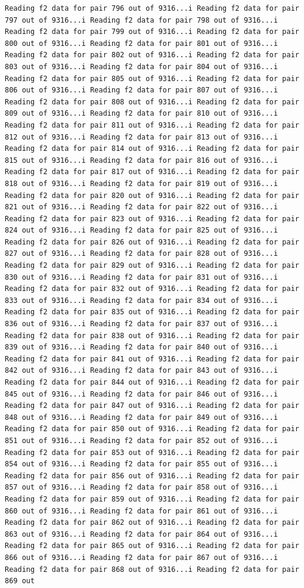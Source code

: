 \documentclass[
]{article}
\begin{document}
\begin{verbatim}
Reading f2 data for pair 796 out of 9316...i Reading f2 data for pair 797 out of 9316...i Reading f2 data for pair 798 out of 9316...i Reading f2 data for pair 799 out of 9316...i Reading f2 data for pair 800 out of 9316...i Reading f2 data for pair 801 out of 9316...i Reading f2 data for pair 802 out of 9316...i Reading f2 data for pair 803 out of 9316...i Reading f2 data for pair 804 out of 9316...i Reading f2 data for pair 805 out of 9316...i Reading f2 data for pair 806 out of 9316...i Reading f2 data for pair 807 out of 9316...i Reading f2 data for pair 808 out of 9316...i Reading f2 data for pair 809 out of 9316...i Reading f2 data for pair 810 out of 9316...i Reading f2 data for pair 811 out of 9316...i Reading f2 data for pair 812 out of 9316...i Reading f2 data for pair 813 out of 9316...i Reading f2 data for pair 814 out of 9316...i Reading f2 data for pair 815 out of 9316...i Reading f2 data for pair 816 out of 9316...i Reading f2 data for pair 817 out of 9316...i Reading f2 data for pair 818 out of 9316...i Reading f2 data for pair 819 out of 9316...i Reading f2 data for pair 820 out of 9316...i Reading f2 data for pair 821 out of 9316...i Reading f2 data for pair 822 out of 9316...i Reading f2 data for pair 823 out of 9316...i Reading f2 data for pair 824 out of 9316...i Reading f2 data for pair 825 out of 9316...i Reading f2 data for pair 826 out of 9316...i Reading f2 data for pair 827 out of 9316...i Reading f2 data for pair 828 out of 9316...i Reading f2 data for pair 829 out of 9316...i Reading f2 data for pair 830 out of 9316...i Reading f2 data for pair 831 out of 9316...i Reading f2 data for pair 832 out of 9316...i Reading f2 data for pair 833 out of 9316...i Reading f2 data for pair 834 out of 9316...i Reading f2 data for pair 835 out of 9316...i Reading f2 data for pair 836 out of 9316...i Reading f2 data for pair 837 out of 9316...i Reading f2 data for pair 838 out of 9316...i Reading f2 data for pair 839 out of 9316...i Reading f2 data for pair 840 out of 9316...i Reading f2 data for pair 841 out of 9316...i Reading f2 data for pair 842 out of 9316...i Reading f2 data for pair 843 out of 9316...i Reading f2 data for pair 844 out of 9316...i Reading f2 data for pair 845 out of 9316...i Reading f2 data for pair 846 out of 9316...i Reading f2 data for pair 847 out of 9316...i Reading f2 data for pair 848 out of 9316...i Reading f2 data for pair 849 out of 9316...i Reading f2 data for pair 850 out of 9316...i Reading f2 data for pair 851 out of 9316...i Reading f2 data for pair 852 out of 9316...i Reading f2 data for pair 853 out of 9316...i Reading f2 data for pair 854 out of 9316...i Reading f2 data for pair 855 out of 9316...i Reading f2 data for pair 856 out of 9316...i Reading f2 data for pair 857 out of 9316...i Reading f2 data for pair 858 out of 9316...i Reading f2 data for pair 859 out of 9316...i Reading f2 data for pair 860 out of 9316...i Reading f2 data for pair 861 out of 9316...i Reading f2 data for pair 862 out of 9316...i Reading f2 data for pair 863 out of 9316...i Reading f2 data for pair 864 out of 9316...i Reading f2 data for pair 865 out of 9316...i Reading f2 data for pair 866 out of 9316...i Reading f2 data for pair 867 out of 9316...i Reading f2 data for pair 868 out of 9316...i Reading f2 data for pair 869 out 
\end{verbatim}
\end{document}
